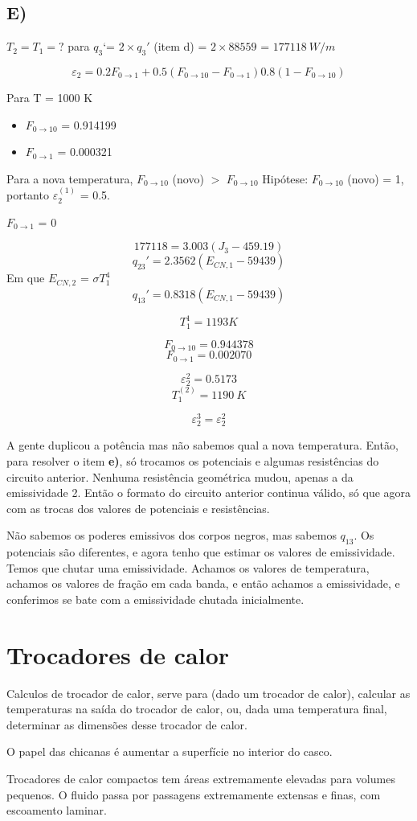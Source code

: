 \documentclass[a4paper, 12pt]{article}
\begin{document}
\subsection{E)}
$T_{2} = T_{1} = ? $ para $q_{3}$`= $2\times q_{3}'$ (item d) = $2 \times 88559$ = $177118 \ W/m$

\[\varepsilon _{2} = 0.2F_{0 \rightarrow 1} + 0.5(F_{0 \rightarrow 10}-F_{0 \rightarrow 1}) 0.8(1-F_{0 \rightarrow 10})\] 

Para T = 1000 K
\begin{itemize}
\item $F_{0 \rightarrow 10}$ = 0.914199
\item $F_{0 \rightarrow 1}$ = 0.000321
\end{itemize}

Para a nova temperatura, $F_{0 \rightarrow 10}$ (novo) $>$ $F_{0 \rightarrow 10}$ 
Hipótese: $F_{0 \rightarrow 10}$ (novo) = 1, portanto $\varepsilon _{2}^{(1)}$ = 0.5.

$F_{0 \rightarrow 1}$ = 0

\[177118 = 3.003(J_{3}-459.19)\]
\[q_{23}'=2.3562(E_{CN,1}-59439)\]
Em que $E_{CN,2}$ = $\sigma T_{1}^{4}$
\[q_{13}'=0.8318(E_{CN,1}-59439)\]

\[T_{1}^{1}=1193K\]





\[F_{0 \rightarrow 10} = 0.944378\]
\[F_{0 \rightarrow 1} = 0.002070\]

\[\varepsilon _{2}^{2} = 0.5173\]
\[T_{1}^{(2)}=1190 \ K\]

\[\varepsilon _{2}^{3} = \varepsilon _{2}^{2}\]

A gente duplicou a potência mas não sabemos qual a nova temperatura. Então, para resolver o item \textbf{e)}, só trocamos os potenciais e algumas resistências do circuito anterior. Nenhuma resistência geométrica mudou, apenas a da emissividade 2. Então o formato do circuito anterior continua válido, só que agora com as trocas dos valores de potenciais e resistências. 

Não sabemos os poderes emissivos dos corpos negros, mas sabemos $q_{13}$. Os potenciais são diferentes, e agora tenho que estimar os valores de emissividade. Temos que chutar uma emissividade. Achamos os valores de temperatura, achamos os valores de fração em cada banda, e então achamos a emissividade, e conferimos se bate com a emissividade chutada inicialmente.

\section{Trocadores de calor}
Calculos de trocador de calor, serve para (dado um trocador de calor), calcular as temperaturas na saída do trocador de calor, ou, dada uma temperatura final, determinar as dimensões desse trocador de calor.

O papel das chicanas é aumentar a superfície no interior do casco.

Trocadores de calor compactos tem áreas extremamente elevadas para volumes pequenos.
O fluido passa por passagens extremamente extensas e finas, com escoamento laminar.
\end{document}
